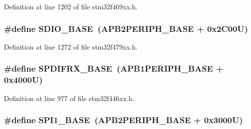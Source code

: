 Definition at line 1202 of file stm32f469xx.\+h.

\subsubsection[{\texorpdfstring{S\+D\+I\+O\+\_\+\+B\+A\+SE}{SDIO_BASE}}]{\setlength{\rightskip}{0pt plus 5cm}\#define S\+D\+I\+O\+\_\+\+B\+A\+SE~({\bf A\+P\+B2\+P\+E\+R\+I\+P\+H\+\_\+\+B\+A\+SE} + 0x2\+C00\+U)}\hypertarget{group___peripheral__memory__map_ga95dd0abbc6767893b4b02935fa846f52}{}\label{group___peripheral__memory__map_ga95dd0abbc6767893b4b02935fa846f52}


Definition at line 1272 of file stm32f479xx.\+h.

\subsubsection[{\texorpdfstring{S\+P\+D\+I\+F\+R\+X\+\_\+\+B\+A\+SE}{SPDIFRX_BASE}}]{\setlength{\rightskip}{0pt plus 5cm}\#define S\+P\+D\+I\+F\+R\+X\+\_\+\+B\+A\+SE~({\bf A\+P\+B1\+P\+E\+R\+I\+P\+H\+\_\+\+B\+A\+SE} + 0x4000\+U)}\hypertarget{group___peripheral__memory__map_gad0c89d1e156c49602ce73483b74c2b6a}{}\label{group___peripheral__memory__map_gad0c89d1e156c49602ce73483b74c2b6a}


Definition at line 977 of file stm32f446xx.\+h.

\subsubsection[{\texorpdfstring{S\+P\+I1\+\_\+\+B\+A\+SE}{SPI1_BASE}}]{\setlength{\rightskip}{0pt plus 5cm}\#define S\+P\+I1\+\_\+\+B\+A\+SE~({\bf A\+P\+B2\+P\+E\+R\+I\+P\+H\+\_\+\+B\+A\+SE} + 0x3000\+U)}\hypertarget{group___peripheral__memory__map_ga50cd8b47929f18b05efbd0f41253bf8d}{}\label{group___peripheral__memory__map_ga50cd8b47929f18b05efbd0f41253bf8d}


